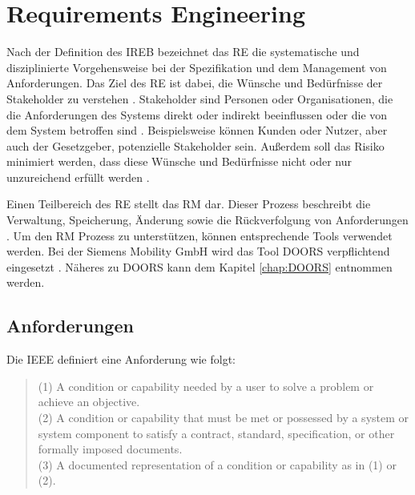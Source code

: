 \section{Requirements Engineering}
\label{chap:Requirements Engineering}
Nach der Definition des \ac{IREB} bezeichnet das \ac{RE} die systematische 
und disziplinierte Vorgehensweise bei der Spezifikation und dem Management von Anforderungen. Das Ziel des \ac{RE} ist dabei, 
die Wünsche und Bedürfnisse der Stakeholder zu verstehen \cite[vgl. S.30]{IREB_Glossary}. Stakeholder sind Personen oder Organisationen, die die 
Anforderungen des Systems direkt oder indirekt beeinflussen oder die von dem System betroffen sind \cite[vgl. S.33]{IREB_Glossary}. 
Beispielsweise können Kunden oder Nutzer, aber auch der Gesetzgeber, potenzielle Stakeholder sein. Außerdem soll das Risiko minimiert werden, 
dass diese Wünsche und Bedürfnisse nicht oder nur unzureichend erfüllt werden \cite[vgl. S.30]{IREB_Glossary}.

Einen Teilbereich des \ac{RE} stellt das \ac{RM} dar. Dieser Prozess beschreibt die Verwaltung, Speicherung, 
Änderung sowie die Rückverfolgung von Anforderungen \cite[vgl. S.8]{IREB_Glossary}. Um den \ac{RM} Prozess zu unterstützen, können entsprechende
Tools verwendet werden. Bei der Siemens Mobility GmbH wird das Tool \ac{DOORS} verpflichtend eingesetzt \cite[vgl. S.18]{SMO-PE}. Näheres zu
\ac{DOORS} kann dem Kapitel \ref*{chap:DOORS} entnommen werden.

\subsection{Anforderungen}
Die IEEE definiert eine Anforderung wie folgt:
\begin{quote}
    \glqq(1) A condition or capability needed by a user to solve a problem or achieve an objective.\\
    (2) A condition or capability that must be met
        or possessed by a system or system component to satisfy a contract, standard, specification, or other formally imposed documents.\\
    (3) A documented representation of a condition or capability as in (1) or (2).\grqq{} \cite[S.62]{IEEE_Glossary}
\end{quote}

